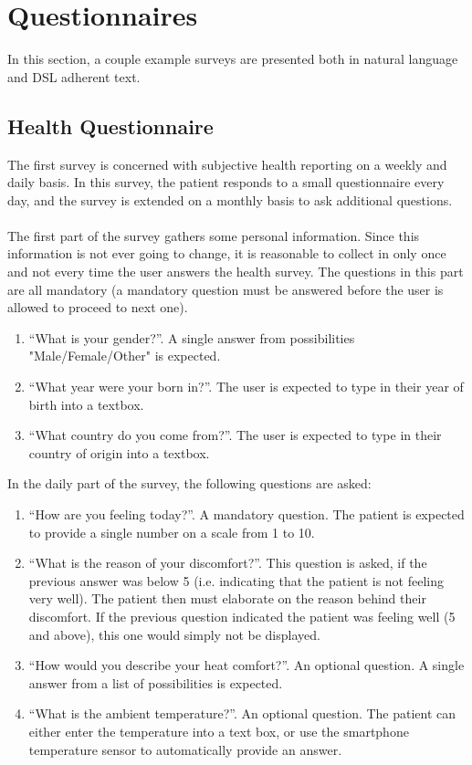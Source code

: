 \section{Questionnaires}
\label{sec:questionnaires}
In this section, a couple example surveys are presented both in natural language and DSL adherent text.

\subsection{Health Questionnaire}
\label{subsec:healthquestionnaire}
The first survey is concerned with subjective health reporting on a weekly and daily basis. In this survey, the patient responds to a small questionnaire every day, and the survey is extended on a monthly basis to ask additional questions.\\\\
The first part of the survey gathers some personal information. Since this information is not ever going to change, it is reasonable to collect in only once and not every time the user answers the health survey. The questions in this part are all mandatory (a mandatory question must be answered before the user is allowed to proceed to next one).

\begin{enumerate}
\item ``What is your gender?''. A single answer from possibilities "Male/Female/Other" is expected.
\item ``What year were your born in?''. The user is expected to type in their year of birth into a textbox.
\item ``What country do you come from?''. The user is expected to type in their country of origin into a textbox.
\end{enumerate}

In the daily part of the survey, the following questions are asked: 

\begin{enumerate}
\item ``How are you feeling today?''. A mandatory question. The patient is expected to provide a single number on a scale from 1 to 10.
\item ``What is the reason of your discomfort?''. This question is asked, if the previous answer was below 5 (i.e. indicating that the patient is not feeling very well). The patient then must elaborate on the reason behind their discomfort. If the previous question indicated the patient was feeling well (5 and above), this one would simply not be displayed.
\item ``How would you describe your heat comfort?''. An optional question. A single answer from a list of possibilities is expected.
\item ``What is the ambient temperature?''. An optional question. The patient can either enter the temperature into a text box, or use the smartphone temperature sensor to automatically provide an answer.
\end{enumerate}

